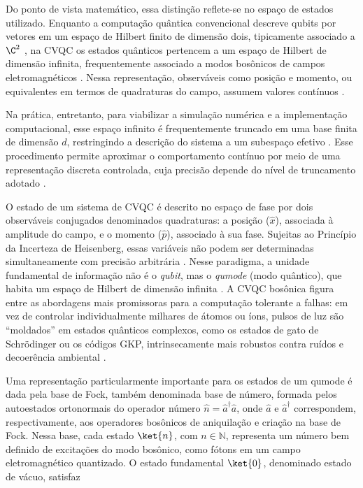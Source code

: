 Do ponto de vista matemático, essa distinção reflete-se no espaço de estados utilizado. Enquanto a computação quântica convencional descreve qubits por vetores em um espaço de Hilbert finito de dimensão dois, tipicamente associado a $\C^2$ \cite{nielsen_quantum_2002}, na CVQC os estados quânticos pertencem a um espaço de Hilbert de dimensão infinita, frequentemente associado a modos bosônicos de campos eletromagnéticos \cite{braunstein2005quantum}. Nessa representação, observáveis como posição e momento, ou equivalentes em termos de quadraturas do campo, assumem valores contínuos \cite{lloyd1999quantum,o2007optical}.

Na prática, entretanto, para viabilizar a simulação numérica e a implementação computacional, esse espaço infinito é frequentemente truncado em uma base finita de dimensão $d$, restringindo a descrição do sistema a um subespaço efetivo \cite{johansson2012qutip}. Esse procedimento permite aproximar o comportamento contínuo por meio de uma representação discreta controlada, cuja precisão depende do nível de truncamento adotado \cite{ripoll2022quantum}.

O estado de um sistema de CVQC é descrito no espaço de fase por dois observáveis conjugados denominados quadraturas: a posição ($\hat{x}$), associada à amplitude do campo, e o momento ($\hat{p}$), associado à sua fase. Sujeitas ao Princípio da Incerteza de Heisenberg, essas variáveis não podem ser determinadas simultaneamente com precisão arbitrária \cite{serafini_quantum_2023, weedbrook2012gaussian}. Nesse paradigma, a unidade fundamental de informação não é o \textit{qubit}, mas o \textit{qumode} (modo quântico), que habita um espaço de Hilbert de dimensão infinita \cite{lloyd1999quantum}. A CVQC bosônica figura entre as abordagens mais promissoras para a computação tolerante a falhas: em vez de controlar individualmente milhares de átomos ou íons, pulsos de luz são ``moldados'' em estados quânticos complexos, como os estados de gato de Schrödinger ou os códigos GKP, intrinsecamente mais robustos contra ruídos e decoerência ambiental \cite{gottesman2000encoding, bourassa2021blueprint}.

Uma representação particularmente importante para os estados de um qumode é dada pela base de Fock, também denominada base de número, formada pelos autoestados ortonormais do operador número $\hat{n}=\hat{a}^{\dagger}\hat{a}$, onde $\hat{a}$ e $\hat{a}^{\dagger}$ correspondem, respectivamente, aos operadores bosônicos de aniquilação e criação na base de Fock. Nessa base, cada estado $\ket{n}$, com $n\in\mathbb{N}$, representa um número bem definido de excitações do modo bosônico, como fótons em um campo eletromagnético quantizado. O estado fundamental $\ket{0}$, denominado estado de vácuo, satisfaz

